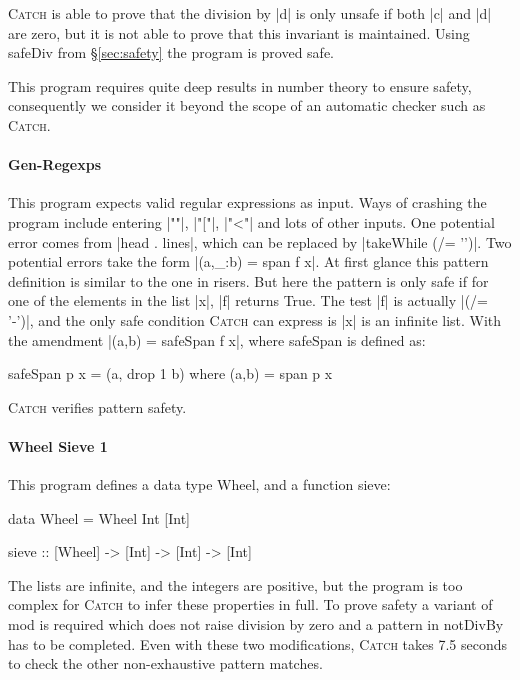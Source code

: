 \documentclass[preprint]{sigplanconf}
\newcommand{\C}[1]{\textsf{#1}}
\newcommand{\catch}{\textsc{Catch}}
\begin{document}
\noindent \catch{} is able to prove that the division by |d| is only unsafe if both |c| and |d| are zero, but it is not able to prove that this invariant is maintained. Using \C{safeDiv} from \S\ref{sec:safety} the program is proved safe.

This program requires quite deep results in number theory to ensure safety, consequently we consider it beyond the scope of an automatic checker such as \catch{}.

\paragraph{Gen-Regexps}

This program expects valid regular expressions as input. Ways of crashing the program include entering |""|, |"["|, |"<"| and lots of other inputs. One potential error comes from |head . lines|, which can be replaced by |takeWhile (/= '\n')|. Two potential errors take the form |(a,_:b) = span f x|. At first glance this pattern definition is similar to the one in \C{risers}. But here the pattern is only safe if for one of the elements in the list |x|, |f| returns True. The test |f| is actually |(/= '-')|, and the only safe condition \catch{} can express is |x| is an infinite list. With the amendment  |(a,b) = safeSpan f x|, where \C{safeSpan} is defined as:

\begin{code}
safeSpan p x = (a, drop 1 b) where (a,b) = span p x
\end{code}

\noindent \catch{} verifies pattern safety.

\paragraph{Wheel Sieve 1}

This program defines a data type \C{Wheel}, and a function \C{sieve}:

\begin{code}
data Wheel = Wheel Int [Int]

sieve :: [Wheel] -> [Int] -> [Int] -> [Int]
\end{code}

The lists are infinite, and the integers are positive, but the program is too complex for \catch{} to infer these properties in full. To prove safety a variant of \C{mod} is required which does not raise division by zero and a pattern in \C{notDivBy} has to be completed. Even with these two modifications, \catch{} takes 7.5 seconds to check the other non-exhaustive pattern matches.
\end{document}
